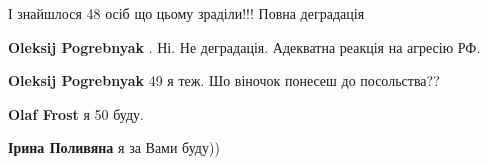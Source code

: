 \begin{itemize}
\begin{itemize}
\begin{itemize}
\end{itemize}

\end{itemize}

 
І знайшлося 48 осіб що цьому зраділи!!! Повна деградація

\begin{itemize}
 
\textbf{Oleksij Pogrebnyak} . Ні. Не деградація. Адекватна реакція на агресію РФ.

 
\textbf{Oleksij Pogrebnyak} 49 я теж. Шо віночок понесеш до посольства??

\begin{itemize}
 
\textbf{Olaf Frost} я 50 буду.

 
\textbf{Ірина Поливяна} я за Вами буду))

 

\end{itemize}
\end{itemize}
\end{itemize}
